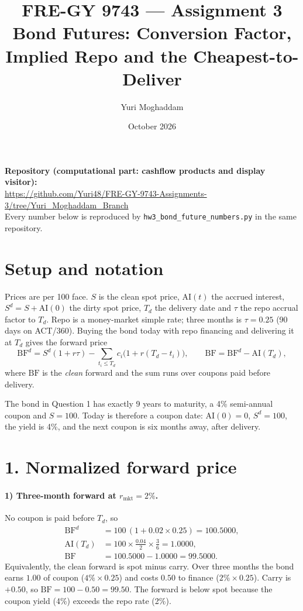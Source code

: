 \documentclass[11pt]{article}
\title{FRE-GY 9743 --- Assignment 3\\ \large Bond Futures: Conversion Factor, Implied Repo and the Cheapest-to-Deliver}
\author{Yuri Moghaddam}
\date{October 2026}
\newcommand{\AI}{\mathrm{AI}}
\newcommand{\BF}{\mathrm{BF}}
\begin{document}
\maketitle

\noindent\textbf{Repository (computational part: cashflow products and display visitor):}\\
\url{https://github.com/Yuri48/FRE-GY-9743-Assignments-3/tree/Yuri_Moghaddam_Branch}\\
Every number below is reproduced by \texttt{hw3\_bond\_future\_numbers.py} in the same repository.

\section*{Setup and notation}
Prices are per 100 face. $S$ is the clean spot price, $\AI(t)$ the accrued interest, $S^{d}=S+\AI(0)$ the dirty spot price, $T_d$ the delivery date and $\tau$ the repo accrual factor to $T_d$. Repo is a money-market simple rate; three months is $\tau=0.25$ (90 days on ACT/360). Buying the bond today with repo financing and delivering it at $T_d$ gives the forward price
\[
\BF^{d}=S^{d}(1+r\tau)-\sum_{t_i\le T_d}c_i\bigl(1+r(T_d-t_i)\bigr),\qquad
\BF=\BF^{d}-\AI(T_d),
\]
where $\BF$ is the \emph{clean} forward and the sum runs over coupons paid before delivery.

The bond in Question 1 has exactly 9 years to maturity, a 4\% semi-annual coupon and $S=100$. Today is therefore a coupon date: $\AI(0)=0$, $S^{d}=100$, the yield is 4\%, and the next coupon is six months away, after delivery.

\section*{1. Normalized forward price}

\paragraph{1) Three-month forward at $r_{\text{mkt}}=2\%$.}
No coupon is paid before $T_d$, so
\begin{align*}
\BF^{d}&=100\,(1+0.02\times0.25)=100.5000,\\
\AI(T_d)&=100\times\tfrac{0.04}{2}\times\tfrac{3}{6}=1.0000,\\
\BF&=100.5000-1.0000=\mathbf{99.5000}.
\end{align*}
Equivalently, the clean forward is spot minus carry. Over three months the bond earns $1.00$ of coupon ($4\%\times0.25$) and costs $0.50$ to finance ($2\%\times0.25$). Carry is $+0.50$, so $\BF=100-0.50=99.50$. The forward is below spot because the coupon yield (4\%) exceeds the repo rate (2\%).
\end{document}
